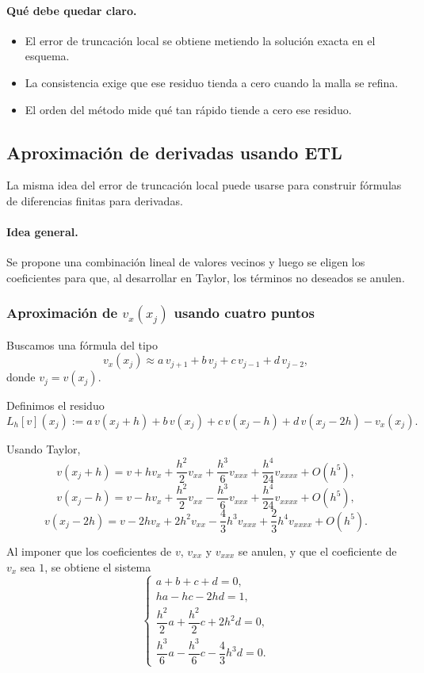 \paragraph{Qué debe quedar claro.}
\begin{itemize}
    \item El error de truncación local se obtiene metiendo la solución exacta en el esquema.
    \item La consistencia exige que ese residuo tienda a cero cuando la malla se refina.
    \item El orden del método mide qué tan rápido tiende a cero ese residuo.
\end{itemize}

\subsection{Aproximación de derivadas usando ETL}

La misma idea del error de truncación local puede usarse para construir fórmulas de diferencias finitas para derivadas.

\paragraph{Idea general.}
Se propone una combinación lineal de valores vecinos y luego se eligen los coeficientes para que, al desarrollar en Taylor, los términos no deseados se anulen.

\subsubsection{Aproximación de \texorpdfstring{$v_x(x_j)$}{v_x(x_j)} usando cuatro puntos}

Buscamos una fórmula del tipo
\[
v_x(x_j)\approx a\,v_{j+1}+b\,v_j+c\,v_{j-1}+d\,v_{j-2},
\]
donde \(v_j=v(x_j)\).

Definimos el residuo
\[
L_h[v](x_j):=
a\,v(x_j+h)+b\,v(x_j)+c\,v(x_j-h)+d\,v(x_j-2h)-v_x(x_j).
\]

Usando Taylor,
\[
v(x_j+h)=v+h v_x+\frac{h^2}{2}v_{xx}+\frac{h^3}{6}v_{xxx}+\frac{h^4}{24}v_{xxxx}+O(h^5),
\]
\[
v(x_j-h)=v-h v_x+\frac{h^2}{2}v_{xx}-\frac{h^3}{6}v_{xxx}+\frac{h^4}{24}v_{xxxx}+O(h^5),
\]
\[
v(x_j-2h)=v-2h v_x+2h^2 v_{xx}-\frac{4}{3}h^3 v_{xxx}+\frac{2}{3}h^4 v_{xxxx}+O(h^5).
\]

Al imponer que los coeficientes de \(v\), \(v_{xx}\) y \(v_{xxx}\) se anulen, y que el coeficiente de \(v_x\) sea \(1\), se obtiene el sistema
\[
\begin{cases}
a+b+c+d=0,\\[4pt]
ha-hc-2hd=1,\\[4pt]
\dfrac{h^2}{2}a+\dfrac{h^2}{2}c+2h^2 d=0,\\[8pt]
\dfrac{h^3}{6}a-\dfrac{h^3}{6}c-\dfrac{4}{3}h^3 d=0.
\end{cases}
\]


